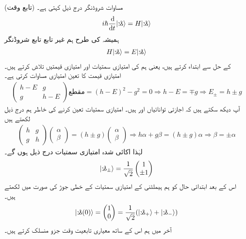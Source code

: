  (تابع وقت) مساوات شروڈنگر درج ذیل کہتی ہے۔ 
\begin{align}
i \hslash \frac{\dif}{\dif t} | \s \rangle = H | \s \rangle
\end{align}
ہمیشہ کی طرح ہم غیر تابع تابع شروڈنگر
\begin{align}
H | \s \rangle = E | \s \rangle 
\end{align}
 کے حل سے ابتداء کرتے ہیں، یعنی ہم  کی امتیازی سمتیات اور امتیازی قیمتیں تلاش کرتے ہیں۔ امتیازی  قیمت کا تعین  امتیازی مساوات  کرتی ہے۔
\begin{align*}
 \begin{pmatrix} h-E & g \\ g & h-E \end{pmatrix}\text{مقطع} = (h-E)^{2} - g^{2} = 0 \Rightarrow h-E = \mp g \Rightarrow E_{\pm} = h \pm g
\end{align*}
آپ دیکھ سکتے ہیں کہ اجازتی توانائیاں  اور  ہیں۔ امتیازی سمتیات تعین کرنے کی خاطر ہم درج ذیل لکھتے ہیں 
\begin{align*}
\begin{pmatrix} h & g \\ g & h \end{pmatrix} \begin{pmatrix}
 \alpha \\ \beta \end{pmatrix} = (h\pm g) \begin{pmatrix} \alpha \\ \beta \end{pmatrix} \Rightarrow h\alpha + g\beta = (h\pm g) \alpha \Rightarrow \beta = \pm \alpha
\end{align*}
لہٰذا اکائی شدہ امتیازی سمتیات درج ذیل ہوں گے۔
\begin{align*}
| \s _{\pm} \rangle = \frac{1}{\sqrt{2}} \begin{pmatrix} 1 \\ \pm 1 \end{pmatrix}
\end{align*}
اس کے بعد ابتدائی حال کو ہم ہیملٹنی کے امتیازی سمتیات کے خطی جوڑ کی صورت میں لکھتے ہیں۔
\begin{align*}
| \s (0) \rangle = \begin{pmatrix} 1 \\ 0 \end{pmatrix} = \frac{1}{\sqrt{2}} ( | \s_{+} \rangle + | \s_{-} \rangle )
\end{align*}
آخر میں ہم اس کے ساتھ معیاری تابعیت وقت جزو  منسلک کرتے ہیں۔ 
